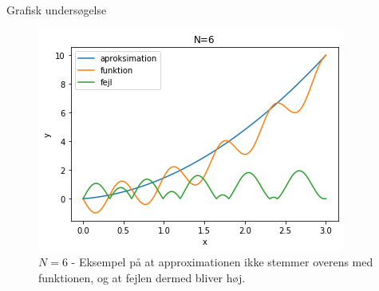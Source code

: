 \begin{frame}{Grafisk undersøgelse}
    \begin{figure}[h!]
    \begin{center}
    \includegraphics[scale=0.5]{images/N=6.png}
    \end{center}
    \caption{$N = 6$ - Eksempel på at approximationen ikke stemmer overens med funktionen, og at fejlen dermed bliver høj.}
    \end{figure} 
    
\end{frame}